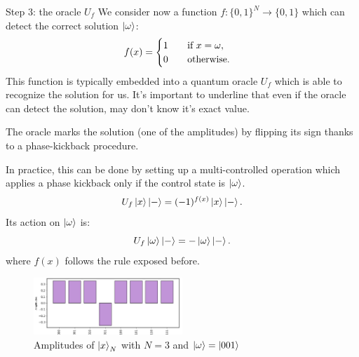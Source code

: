 \documentclass[aspectratio=169, 8pt, xcolor={svgnames}, hyperref={linkcolor=black}]{beamer}
\begin{document}
\begin{frame}{Step 3: the oracle $U_f$}
We consider now a function $f:\{0,1\}^N \to \{0,1\}$ which can detect the correct solution $\ket{\omega}$:
$$
f(x) = \begin{cases}
1 \qquad \text{if\,\,} x=\omega, \\
0 \qquad \text{otherwise}.
\end{cases} $$ \pause
This function is typically embedded into a quantum oracle $U_f$ which is able to
recognize the solution for us. It's important to underline that even if the oracle
can detect the solution, may don't know it's exact value. \pause

\textcolor{carnelian}{The oracle marks the solution (one of the amplitudes) by flipping its sign thanks to
a phase-kickback procedure.} \pause


\begin{multicols}{2}
In practice, this can be done by setting up a multi-controlled operation
which applies a phase kickback only if the control state is $\ket{\omega}$.
$$ U_f \ket{x}\ket{-} = (-1)^{f(x)}\ket{x}\ket{-}. $$
Its action on $\ket{\omega}$ is:
$$ U_f \ket{\omega}\ket{-} = -\ket{\omega}\ket{-}. $$
where $f(x)$ follows the rule exposed before.
\begin{figure}
   \includegraphics[width=0.5\textwidth]{figures/state2.png}
   \caption*{Amplitudes of $\ket{x}_N$ with $N=3$ and $\ket{\omega} = \ket{001}$}
\end{figure}
\end{multicols}

\end{frame}
\end{document}
